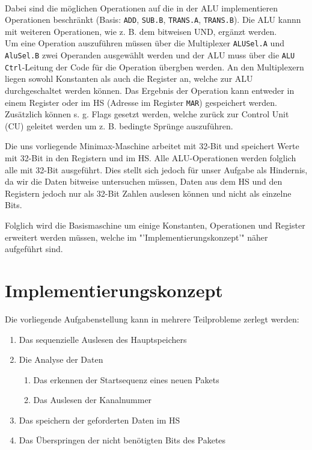 \documentclass[12pt,titlepage]{article}
\begin{document}
\leavevmode \\

Dabei sind die m{\"o}glichen Operationen auf die in der ALU implementieren
Operationen beschr{\"a}nkt (Basis: \texttt{ADD}, \texttt{SUB.B}, \texttt{TRANS.A}, \texttt{TRANS.B}). Die ALU kannn mit weiteren Operationen,
wie z. B. dem bitweisen UND, erg{\"a}nzt werden.\\
Um eine Operation auszuf{\"u}hren m{\"u}ssen {\"u}ber die Multiplexer \texttt{ALUSel.A} und \texttt{AluSel.B} zwei Operanden ausgew{\"a}hlt werden
und der ALU muss {\"u}ber die \texttt{ALU Ctrl}-Leitung der Code f{\"u}r die Operation {\"u}bergben werden. An den Multiplexern liegen sowohl
Konstanten als auch die Register an, welche zur ALU durchgeschaltet werden k{\"o}nnen. Das Ergebnis der Operation kann
entweder in einem Register oder im HS (Adresse im Register \texttt{MAR}) gespeichert werden. Zus{\"a}tzlich k{\"o}nnen s. g. Flags 
gesetzt werden, welche zur{\"u}ck zur Control Unit (CU) geleitet werden um z. B. bedingte Spr{\"u}nge auszuf{\"u}hren.


Die uns vorliegende Minimax-Maschine arbeitet mit 32-Bit und speichert Werte mit 32-Bit in den Registern und im HS.
Alle ALU-Operationen werden folglich alle mit 32-Bit ausgef{\"u}hrt. Dies stellt sich jedoch f{\"u}r unser Aufgabe als
Hindernis, da wir die Daten bitweise untersuchen m{\"u}ssen, Daten aus dem HS und den Registern jedoch nur als
32-Bit Zahlen auslesen k{\"o}nnen und nicht als einzelne Bits.

Folglich wird die Basismaschine um einige Konstanten, Operationen und Register erweitert werden müssen, welche im "'Implementierungskonzept'" n{\"a}her
aufgeführt sind.

\newpage

\section{Implementierungskonzept}
Die vorliegende Aufgabenstellung kann in mehrere Teilprobleme zerlegt werden:
\begin{enumerate}
\item Das sequenzielle Auslesen des Hauptspeichers
\item Die Analyse der Daten
    \begin{enumerate}
    \item Das erkennen der Startsequenz eines neuen Pakets
    \item Das Auslesen der Kanalnummer
    \end{enumerate}
\item Das speichern der geforderten Daten im HS
\item Das Überspringen der nicht benötigten Bits des Paketes
\end{enumerate}
\end{document}
